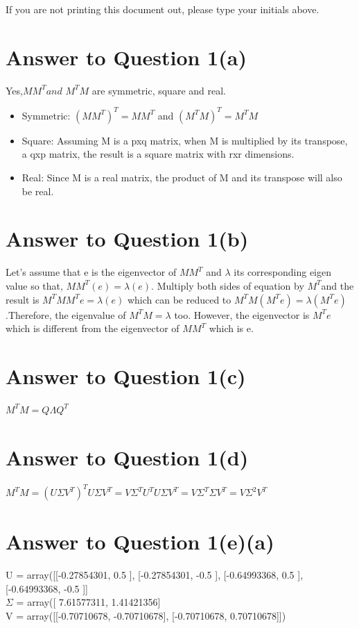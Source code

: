 \documentclass[11pt]{article}
\begin{document}
If you are not printing this document out, please type your initials above.

\vfill
\vfill

\pagebreak[4]
\section*{Answer to Question 1(a)}
Yes,$MM^{T} and$ $M^{T}M$ are symmetric, square and real.\\
\begin{itemize}
\item Symmetric: $(MM^{T})^T = MM^{T}$ and $(M^{T}M)^T = M^{T}M$
\item Square: Assuming M is a pxq matrix, when M is multiplied by its transpose, a qxp matrix, the result is a square matrix with rxr dimensions.
\item Real: Since M is a real matrix, the product of M and its transpose will also be real.
\end{itemize}
\section*{Answer to Question 1(b)}
Let's assume that e is the eigenvector of $MM^T$ and $\lambda$ its corresponding eigen value so that, $MM^T(e) = \lambda (e)$.
Multiply both sides of equation by $M^T$and the result is 
$M^TMM^Te = \lambda (e)$ which can be reduced to 
$M^TM(M^Te) = \lambda(M^Te)$.Therefore, the eigenvalue of $M^TM = \lambda$ too. However, the eigenvector is $M^Te$ which is different from the eigenvector of $MM^T$ which is e.
\section*{Answer to Question 1(c)}
$M^TM = Q\Lambda Q^T$
\section*{Answer to Question 1(d)}
$M^TM = (U \Sigma V^T)^T U \Sigma V^T = V\Sigma^T U^T U\Sigma V^T =   V\Sigma^T \Sigma V^T =  V\Sigma^2 V^T$
\section*{Answer to Question 1(e)(a)}
U = array([[-0.27854301,  0.5       ],
       [-0.27854301, -0.5       ],
       [-0.64993368,  0.5       ],
       [-0.64993368, -0.5       ]] \\
$\Sigma$ =  array([ 7.61577311,  1.41421356] \\
V = array([[-0.70710678, -0.70710678],
       [-0.70710678,  0.70710678]])
\end{document}
